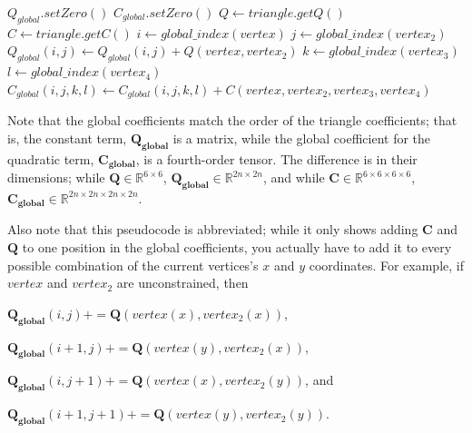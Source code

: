 \documentclass[twocolumn,10pt]{asme2ej}
\begin{document}
\begin{algorithmic}[1]
        \State $Q_{global}.setZero()$
        \State $C_{global}.setZero()$
         \State $Q \gets triangle.getQ()$
         \State $C \gets triangle.getC()$
                  \State $i \gets global\_index(vertex)$
                          \State $j \gets global\_index(vertex_2)$
                          \State $Q_{global}(i,j) \gets Q_{global}(i,j) + Q(vertex, vertex_2)$
                                \State $k \gets global\_index(vertex_3)$
                                    \State $l \gets global\_index(vertex_4)$
                                    \State $C_{global}(i,j,k,l)  \gets C_{global}(i,j,k,l)+C(vertex, vertex_2, vertex_3, vertex_4)$
                                  \EndFor
                            \EndFor
                      \EndIf
                    \EndFor
              \EndIf
            \EndFor
        \EndFor
    \EndFunction
\end{algorithmic}

Note that the global coefficients match the order of the triangle coefficients; that is, the constant term, $\bm{Q_{global}}$ is a matrix, while the global coefficient for the quadratic term, $\bm{C_{global}}$, is a fourth-order tensor. The difference is in their dimensions; while $\bm{Q} \in \mathbb{R}^{6 \times 6}$, $\bm{Q_{global}} \in \mathbb{R}^{2n \times 2n}$, and while  $\bm{C} \in \mathbb{R}^{6 \times 6 \times 6 \times 6}$, $\bm{C_{global}} \in \mathbb{R}^{2n \times 2n \times 2n \times 2n}$.

Also note that this pseudocode is abbreviated; while it only shows adding $\bm{C}$ and $\bm{Q}$ to one position in the global coefficients, you actually have to add it to every possible combination of the current vertices's $x$ and $y$ coordinates. For example, if $vertex$ and $vertex_2$ are unconstrained, then

\begin{center}
$\bm{Q_{global}}(i,j) += \bm{Q}(vertex(x), vertex_2(x))$,

$\bm{Q_{global}}(i + 1,j) += \bm{Q}(vertex(y), vertex_2(x))$,

$\bm{Q_{global}}(i ,j + 1) += \bm{Q}(vertex(x), vertex_2(y))$, and

$\bm{Q_{global}}(i + 1,j + 1) += \bm{Q}(vertex(y), vertex_2(y))$.
\end{center}
\end{document}
